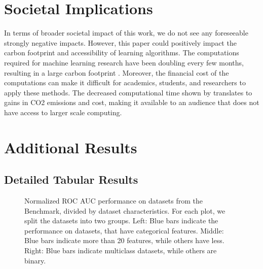 \documentclass{article}
\begin{document}
\section{Societal Implications}
\label{sec:impacts}
In terms of broader societal impact of this work, we do not see any foreseeable strongly negative impacts.
However, this paper could positively impact the carbon footprint and accessibility of learning algorithms. The computations required for machine learning research have been doubling every few months, resulting in a large carbon footprint \citep{schwartz2020green}. Moreover, the financial cost of the computations can make it difficult for academics, students, and researchers to apply these methods.
The decreased computational time shown by \methodname{} translates to gains in CO2 emissions and cost, making it available to an audience that does not have access to larger scale computing. 
\section{Additional Results}\label{app:ssec:addresults} %
\subsection{Detailed Tabular Results}
\label{app:sec:detailed_results}
\begin{figure}[h]
 \centering
 \hspace*{-0.9cm}
 
      \caption{Normalized ROC AUC performance on datasets from the \openmlcc{} Benchmark, divided by dataset characteristics. For each plot, we split the datasets into two groups. Left: Blue bars indicate the performance on datasets, that have categorical features. Middle: Blue bars indicate more than 20 features, while others have less. Right: Blue bars indicate multiclass datasets, while others are binary.}
 \label{fig:results_dataset_characteristics}
\end{figure}
     
\end{document}
